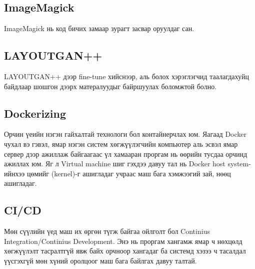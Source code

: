 \subsection{ImageMagick}
ImageMagick нь код бичих замаар зурагт засвар оруулдаг сан.
\subsection{LAYOUTGAN++}
LAYOUTGAN++ дээр fine-tune хийснээр, аль болох хэрэглэгчид таалагдахуйц байдлаар шошгон дээрх матералуудыг байршуулах боломжтой болно.
\subsection{Dockerizing}
Орчин үеийн нэгэн гайхалтай технологи бол контайнерчлах юм. Яагаад Docker чухал вэ гэвэл, ямар нэгэн систем хөгжүүлэгчийн компьютер аль эсвэл ямар сервер дээр ажиллаж байгаагаас үл хамааран проргам нь өөрийн тусдаа орчинд ажиллах юм. Яг л Virtual machine шиг гэхдээ давуу тал нь Docker host system-ийнхээ цөмийг (kernel)-г ашигладаг учраас маш бага хэмжээгий зай, нөөц ашигладаг.
\subsection{CI/CD}
Мөн сүүлийн үед маш их өргөн түгж байгаа ойлголт бол Continius Integration/Continius Development.
Энэ нь проргам хангамж ямар ч нөхцөлд хөгжүүлэлт тасралтгүй явж байх орчноор хангадаг ба системд хэзээ ч тасалдал үүсгэхгүй мөн хүний оролцоог маш бага байлгах давуу талтай.